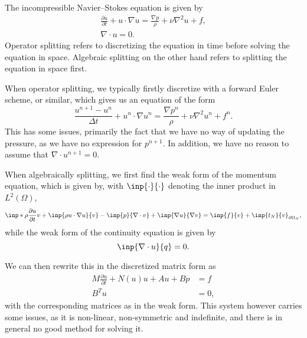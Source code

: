 The incompressible Navier--Stokes equation is given by %
\begin{equation}
    \begin{split}
        \frac{\partial u}{\partial t} + u \cdot \nabla u = \frac{\nabla p}{\rho} + \nu \nabla^2u + f, \\
        \nabla \cdot u = 0.
    \end{split}
\end{equation}
Operator splitting refers to discretizing the equation in time before solving the equation in space.
Algebraic splitting on the other hand refers to splitting the equation in space first.

When operator splitting, we typically firstly discretize with a forward Euler scheme, or similar, which gives us an equation of the form
\begin{equation}
    \frac{u^{n+1} - u^n}{\Delta t} + u^n \cdot \nabla u^n = \frac{\nabla p^n}{\rho} + \nu \nabla^2 u^n + f^n.
\end{equation}
This has some issues, primarily the fact that we have no way of updating the pressure, as we have no expression for $p^{n+1}$.
In addition, we have no reason to assume that $\nabla \cdot u^{n+1} = 0$.

When algebraically splitting, we first find the weak form of the momentum equation, which is given by, with $\inp{\cdot}{\cdot}$ denoting the inner product in $L^2(\Omega)$,
\begin{equation}
    \inp*{\rho \frac{\partial u}{\partial t}}{v}
    + \inp{\rho u \cdot \nabla u}{v}
    - \inp{p}{\nabla \cdot v}
    + \inp{\nabla u}{\nabla v}
    = \inp{f}{v}
    + \inp{t_N}{v}_{\partial\Omega_N},
\end{equation}
while the weak form of the continuity equation is given by
\begin{equation}
    \inp{\nabla \cdot u}{q} = 0.
\end{equation}

We can then rewrite this in the discretized matrix form as
\begin{equation}
    \begin{split}
        M \frac{\partial u}{\partial t} + N(u)u + A u + B p &= f \\
        B^T u &= 0,
    \end{split}
\end{equation}
with the corresponding matrices as in the weak form.
This system however carries some issues, as it is non-linear, non-symmetric and indefinite, and there is in general no good method for solving it.
